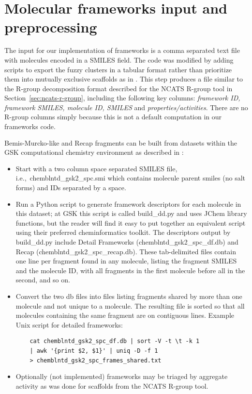 \documentclass[11pt,letterpaper]{article}
\newcommand*\sref[1]{Section~\ref{sec:#1}}
\newcommand*\ie{i.e.,~}
\begin{document}
\newpage 

\section{Molecular frameworks input and preprocessing}
\label{sec:gskfw-prepro}
The input for our implementation of frameworks is a comma separated text file
with molecules encoded in a SMILES field.  The code was modified by
adding scripts to export the fuzzy clusters in a tabular format rather
than prioritize them into mutually exclusive scaffolds as in
\cite{Harper2004DDclus}. This step produces a file similar to
the R-group decomposition format described for the NCATS R-group tool
in \sref{ncats-r-group}, including the following key columns: \emph{framework
  ID, framework SMILES, molecule ID, SMILES} and
\emph{properties/activities}.  There are no R-group columns simply
because this is not a default computation in our frameworks code.

Bemis-Murcko-like and Recap fragments can be built from datasets within the GSK computational chemistry environment as described in \cite{Harper2004DDclus}:
\begin{itemize}
\item Start with a two column space separated SMILES file, \ie chemblntd\_gsk2\_spc.smi which contains molecule parent smiles (no salt forms) and IDs separated by a space. 
\item Run a Python script to generate framework descriptors for each molecule in this dataset; at GSK this script is called build\_dd.py and uses {JChem} library functions, but the reader will find it easy to put together an equivalent script using their preferred cheminformatics toolkit.  The descriptors output by build\_dd.py include Detail Frameworks (chemblntd\_gsk2\_spc\_df.db) and Recap (chemblntd\_gsk2\_spc\_recap.db). These tab-delimited files contain one line per fragment found in any molecule, listing the fragment SMILES and the molecule ID, with all fragments in the first molecule before all in the second, and so on.
\item Convert the two db files into files listing fragments shared by more than one molecule and not unique to a molecule. The resulting file is sorted so that all molecules containing the same fragment are on contiguous lines. Example Unix script for detailed frameworks:
  \begin{verbatim}
    cat chemblntd_gsk2_spc_df.db | sort -V -t \t -k 1
    | awk '{print $2, $1}' | uniq -D -f 1
    > chemblntd_gsk2_spc_frames_shared.txt
  \end{verbatim}
\item Optionally (not implemented) frameworks may be triaged by aggregate activity as was done for scaffolds from the NCATS R-group tool.   
    
\end{itemize}
\end{document}
